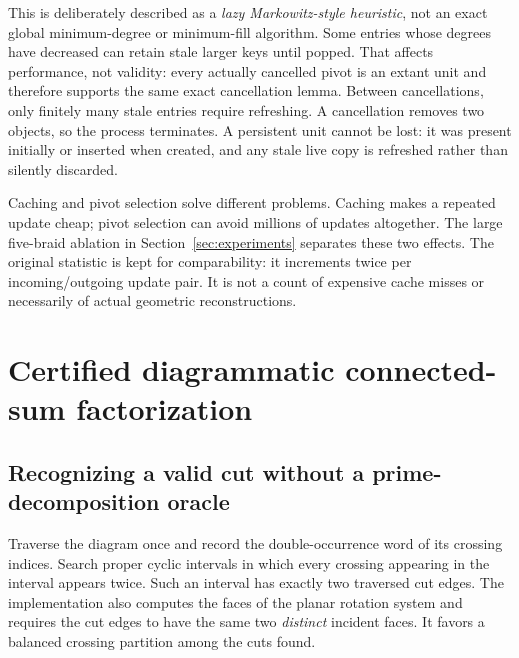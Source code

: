 \documentclass[11pt,letterpaper]{article}
\theoremstyle{definition}\newtheorem{definition}[theorem]{Definition}
\theoremstyle{remark}\newtheorem{remark}[theorem]{Remark}
\newcommand{\code}[1]{\texttt{\detokenize{#1}}}
\begin{document}
This is deliberately described as a \emph{lazy Markowitz-style heuristic}, not
an exact global minimum-degree or minimum-fill algorithm. Some entries whose
degrees have decreased can retain stale larger keys until popped. That affects
performance, not validity: every actually cancelled pivot is an extant unit and
therefore supports the same exact cancellation lemma. Between cancellations,
only finitely many stale entries require refreshing. A cancellation removes two
objects, so the process terminates. A persistent unit cannot be lost: it was
present initially or inserted when created, and any stale live copy is refreshed
rather than silently discarded.

Caching and pivot selection solve different problems. Caching makes a repeated
update cheap; pivot selection can avoid millions of updates altogether. The
large five-braid ablation in Section~\ref{sec:experiments} separates these two
effects. The original \code{compositions} statistic is kept for comparability:
it increments twice per incoming/outgoing update pair. It is not a count of
expensive cache misses or necessarily of actual geometric reconstructions.

\section{Certified diagrammatic connected-sum factorization}
\label{sec:factors}

\subsection{Recognizing a valid cut without a prime-decomposition oracle}

Traverse the diagram once and record the double-occurrence word of its crossing
indices. Search proper cyclic intervals in which every crossing appearing in
the interval appears twice. Such an interval has exactly two traversed cut
edges. The implementation also computes the faces of the planar rotation system
and requires the cut edges to have the same two \emph{distinct} incident faces.
It favors a balanced crossing partition among the cuts found.
\end{document}

